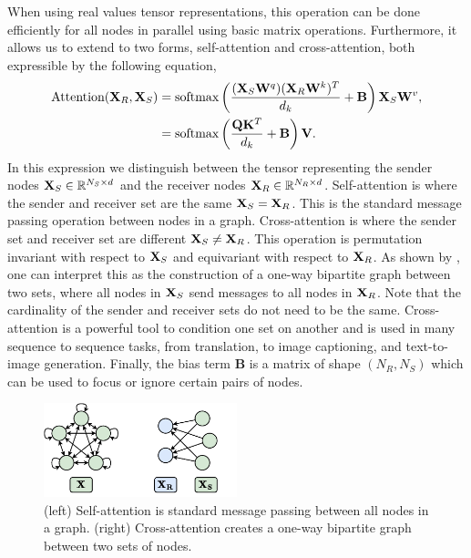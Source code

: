 When using real values tensor representations, this operation can be done efficiently for all nodes in parallel using basic matrix operations.
Furthermore, it allows us to extend to two forms, self-attention and cross-attention, both expressible by the following equation,
\begin{equation}
    \label{eq:attention}
    \begin{aligned}
        \text{Attention}(\mathbf{X}_R, \mathbf{X}_S)
        &= \text{softmax}\left(\frac{(\mathbf{X}_S \mathbf{W}^q) (\mathbf{X}_R \mathbf{W}^k)^T}{d_k} + \mathbf{B}\right) \mathbf{X}_S \mathbf{W}^v, \\
        &= \text{softmax}\left(\frac{\mathbf{Q} \mathbf{K}^T}{d_k} + \mathbf{B}\right) \mathbf{V}.
    \end{aligned}
    \end{equation}
In this expression we distinguish between the tensor representing the sender nodes $\mathbf{X}_S \in \mathbb{R}^{N_S \times d}$ and the receiver nodes $\mathbf{X}_R \in \mathbb{R}^{N_R \times d}$.
Self-attention is where the sender and receiver set are the same $\mathbf{X}_S = \mathbf{X}_R$.
This is the standard message passing operation between nodes in a graph.
Cross-attention is where the sender set and receiver set are different $\mathbf{X}_S \neq \mathbf{X}_R$.
This operation is permutation invariant with respect to $\mathbf{X}_S$ and equivariant with respect to $\mathbf{X}_R$.
As shown by , one can interpret this as the construction of a one-way bipartite graph between two sets, where all nodes in $\mathbf{X}_S$ send messages to all nodes in $\mathbf{X}_R$.
Note that the cardinality of the sender and receiver sets do not need to be the same.
Cross-attention is a powerful tool to condition one set on another and is used in many sequence to sequence tasks, from translation, to image captioning, and text-to-image generation.
Finally, the bias term $\mathbf{B}$ is a matrix of shape $(N_R, N_S)$ which can be used to focus or ignore certain pairs of nodes.

\begin{figure}
    \centering
    \includegraphics[width=0.5\textwidth]{Figures/transformers/bipartite.pdf}
    \caption{(left) Self-attention is standard message passing between all nodes in a graph. (right) Cross-attention creates a one-way bipartite graph between two sets of nodes.}
    \label{fig:bipartite}
\end{figure}

